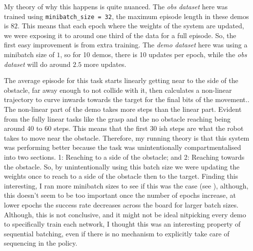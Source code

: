 My theory of why this happens is quite nuanced.\todo[color=purple]{} The \emph{obs dataset} here was trained using \verb|minibatch_size = 32|, the maximum episode length in these demos is $82$. This means that each epoch where the weights of the system are updated, we were exposing it to around one third of the data for a full episode. So, the first easy improvement is from extra training. The \emph{demo dataset} here was using a minibatch size of $1$, so for 10 demos, there is 10 updates per epoch, while the \emph{obs dataset} will do around $2.5$ more updates. 

The average episode for this task starts linearly getting near to the side of the obstacle, far away enough to not collide with it, then calculates a non-linear trajectory to curve inwards towards the target for the final bits of the movement.. The non-linear part of the demo takes more steps than the linear part. Evident from the fully linear tasks like the grasp and the no obstacle reaching being around $40$ to $60$ steps. This means that the first $30$ ish steps are what the robot takes to move near the obstacle. Therefore, my running theory is that this system was performing better because the task was unintentionally compartmentalised into two sections. 1: Reaching to a side of the obstacle; and 2: Reaching towards the obstacle. So, by unintentionally using this batch size we were updating the weights once to reach to a side of the obstacle then to the target. Finding this interesting, I ran more minibatch sizes to see if this was the case (see ), although, this doesn't seem to be too important once the number of epochs increase, at lower epochs the success rate decreases across the board for larger batch sizes. Although, this is not conclusive, and it might not be ideal nitpicking every demo to specifically train each network, I thought this was an interesting property of sequential batching, even if there is no mechanism to explicitly take care of sequencing in the policy.


